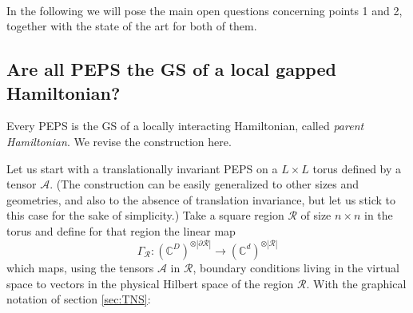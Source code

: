 \documentclass[smallextended]{svjour3}
\renewcommand{\1}{\mathbbm{1}}
\newcommand{\C}{\mathbb{C}}
\begin{document}
\

In the following we will pose the main open questions concerning points 1 and 2, together with the state of the art for both of them.
\subsection{Are all PEPS the GS of a local gapped Hamiltonian?}

Every PEPS is the GS of a locally interacting Hamiltonian, called {\it parent Hamiltonian}. We revise the construction here.

Let us start with a translationally invariant PEPS on a $L\times L$ torus defined by a tensor $\mathcal{A}$. (The construction can be easily generalized to other sizes and geometries, and also to the absence of translation invariance, but let us stick to this case for the sake of simplicity.) Take a square region $\mathcal{R}$ of size $n\times n$ in the torus and define for that region the linear map
$$\Gamma_\mathcal{R}: (\C^D)^{\otimes |\partial \mathcal{R}|}\rightarrow (\C^d)^{\otimes |\mathcal{R}|}$$
which maps, using the tensors $\mathcal{A}$ in $\mathcal{R}$, boundary conditions living in the virtual space to vectors in the physical Hilbert space of the region $\mathcal{R}$. With the graphical notation of section \ref{sec:TNS}:
\end{document}
